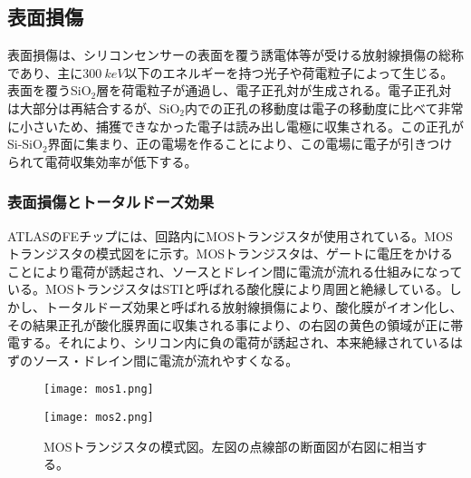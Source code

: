 \subsection{表面損傷}
\label{sec:hyoumen}
表面損傷は、シリコンセンサーの表面を覆う誘電体等が受ける放射線損傷の総称であり、主に$300\ \si{keV}$以下のエネルギーを持つ光子や荷電粒子によって生じる。表面を覆うSiO$_2$層を荷電粒子が通過し、電子正孔対が生成される。電子正孔対は大部分は再結合するが、SiO$_2$内での正孔の移動度は電子の移動度に比べて非常に小さいため、捕獲できなかった電子は読み出し電極に収集される。この正孔がSi-SiO$_2$界面に集まり、正の電場を作ることにより、この電場に電子が引きつけられて電荷収集効率が低下する。


\subsubsection{表面損傷とトータルドーズ効果}
\label{sec:totaldoze}

ATLASのFEチップには、回路内にMOSトランジスタが使用されている。MOSトランジスタの模式図をに示す。MOSトランジスタは、ゲートに電圧をかけることにより電荷が誘起され、ソースとドレイン間に電流が流れる仕組みになっている。MOSトランジスタはSTIと呼ばれる酸化膜により周囲と絶縁している。しかし、トータルドーズ効果と呼ばれる放射線損傷により、酸化膜がイオン化し、その結果正孔が酸化膜界面に収集される事により、の右図の黄色の領域が正に帯電する。それにより、シリコン内に負の電荷が誘起され、本来絶縁されているはずのソース・ドレイン間に電流が流れやすくなる。

\begin{figure}[tbp]
  \begin{minipage}[b]{0.5\linewidth}
    \centering
    \texttt{[image: mos1.png]}
  \end{minipage}
  \begin{minipage}[b]{0.5\linewidth}
    \centering
    \texttt{[image: mos2.png]}
  \end{minipage}
  \caption[MOSトランジスタの模式図]{MOSトランジスタの模式図。左図の点線部の断面図が右図に相当する。}
  \label{fig:mos}
\end{figure}

